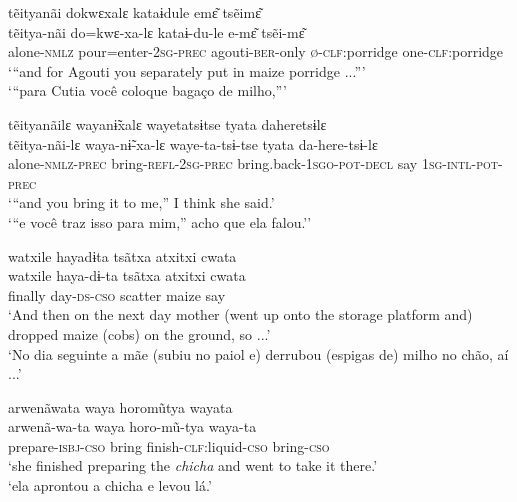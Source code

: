 \documentclass[output=paper,
modfonts,nonflat
]{langsci/langscibook}
\begin{document}
\ea tẽityanãi dokwɛxalɛ kataɨdule emɛ͂ tsẽimɛ͂\\[.3em]
\gll tẽitya-nãi		do=kwɛ-xa-lɛ				kataɨ-du-le		e-mɛ͂			tsẽi-mɛ͂	\\
alone-\textsc{nmlz}	pour=enter-\textsc{2sg-prec}	agouti-\textsc{ber}-only	\textsc{ø-clf}:porridge	one-\textsc{clf}:porridge\\
\glt ‘“and for Agouti you separately put in maize porridge ...”’\\
‘“para Cutia você coloque bagaço de milho,”'
\z

\ea tẽityanãilɛ wayanɨ̃xalɛ wayetatsɨtse tyata daheretsɨlɛ\\[.3em]
\gll tẽitya-nãi-lɛ		waya-nɨ̃-xa-lɛ				waye-ta-tsɨ-tse{\footnotemark}				tyata	da-here-tsɨ-lɛ{\footnotemark}\\
alone-\textsc{nmlz-prec}	bring-\textsc{refl-2sg-prec}	bring.back-\textsc{1sgo-pot-decl}	say		\textsc{1sg-intl-pot-prec}\\
\glt ‘“and you bring it to me,” I think she said.’\\
‘“e você traz isso para mim,” acho que ela falou.’'
\addtocounter{footnote}{-1}
\z

\ea watxile hayadɨta tsãtxa atxitxi cwata\\[.3em]
\gll watxile	haya-dɨ-ta		tsãtxa	atxitxi	cwata\\
finally		day-\textsc{ds-cso}	scatter	maize	say\\
\glt ‘And then on the next day mother (went up onto the storage platform and) dropped maize (cobs) on the ground, so ...’\\
‘No dia seguinte a mãe (subiu no paiol e) derrubou (espigas de) milho no chão, aí ...'
\z

\ea arwenãwata waya horomũtya wayata\\[.3em]
\gll arwenã-wa-ta		waya	horo-mũ-tya			waya-ta\\
prepare-\textsc{isbj-cso}	bring	finish-\textsc{clf}:liquid-\textsc{cso}	bring-\textsc{cso}\\
\glt ‘she finished preparing the \textit{chicha} and went to take it there.’\\
‘ela aprontou a chicha e levou lá.'
\z
\end{document}
